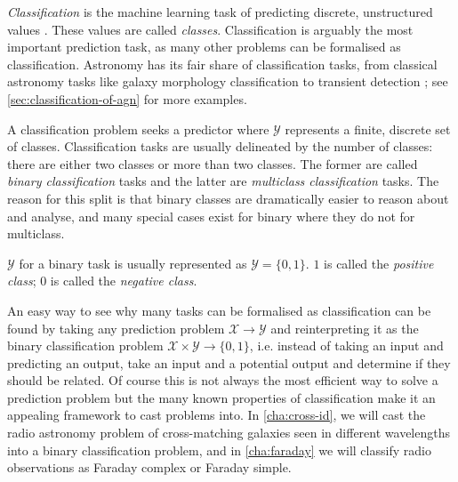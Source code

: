 \documentclass[11pt, a4paper]{book}
\newcommand{\defn}[1]{\emph{#1}}
\begin{document}
        \defn{Classification} is the machine learning task of predicting discrete, unstructured values \citep{deisenroth_mathematics_2020}. These values are called \defn{classes}. Classification is arguably the most important prediction task, as many other problems can be formalised as classification. Astronomy has its fair share of classification tasks, from classical astronomy tasks like galaxy morphology classification \citep[appearing in machine learning literature as e.g.][]{dieleman15cnn} to transient detection \citep[e.g.][]{scalzo_skymapper_2017}; see \autoref{sec:classification-of-agn} for more examples.

        A classification problem seeks a predictor where $\mathcal Y$ represents a finite, discrete set of classes. Classification tasks are usually delineated by the number of classes: there are either two classes or more than two classes. The former are called \defn{binary classification} tasks and the latter are \defn{multiclass classification} tasks. The reason for this split is that binary classes are dramatically easier to reason about and analyse, and many special cases exist for binary where they do not for multiclass.

        $\mathcal Y$ for a binary task is usually represented as $\mathcal Y = \{0, 1\}$. $1$ is called the \defn{positive class}; $0$ is called the \defn{negative class}.

        An easy way to see why many tasks can be formalised as classification can be found by taking any prediction problem $\mathcal X \to \mathcal Y$ and reinterpreting it as the binary classification problem $\mathcal X \times \mathcal Y \to \{0, 1\}$, i.e. instead of taking an input and predicting an output, take an input and a potential output and determine if they should be related. Of course this is not always the most efficient way to solve a prediction problem but the many known properties of classification make it an appealing framework to cast problems into. In \autoref{cha:cross-id}, we will cast the radio astronomy problem of cross-matching galaxies seen in different wavelengths into a binary classification problem, and in \autoref{cha:faraday} we will classify radio observations as Faraday complex or Faraday simple.
\end{document}
